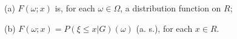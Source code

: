 (a) $F(\omega; x)$ is, for each $\omega \in \Omega$, a distribution function on $R$;

(b) $F(\omega; x) = P(\xi \leq x | G)(\omega)$ (a. s.), for each $x \in R$.
